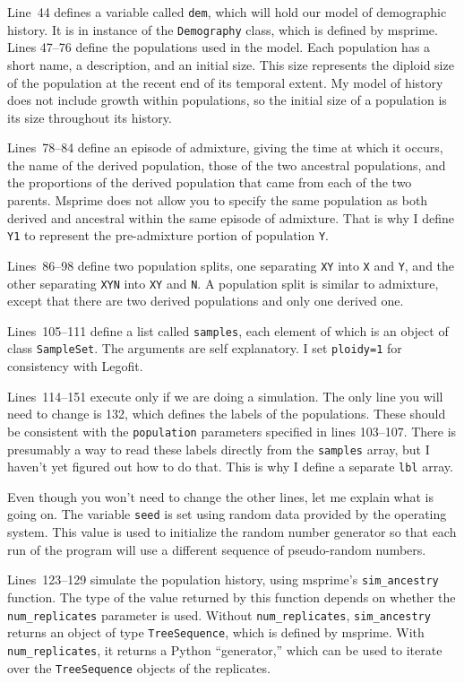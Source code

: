 \documentclass[11pt]{article}
\begin{document}
Line~44 defines a variable called \texttt{dem}, which will hold our
model of demographic history. It is in instance of the
\texttt{Demography} class, which is defined by msprime. Lines 47--76
define the populations used in the model. Each population has a short
name, a description, and an initial size. This size represents the
diploid size of the population at the recent end of its temporal
extent. My model of history does not include growth within
populations, so the initial size of a population is its size
throughout its history.

Lines~78--84 define an episode of admixture, giving the time at which
it occurs, the name of the derived population, those of the two
ancestral populations, and the proportions of the derived population
that came from each of the two parents. Msprime does not allow you to
specify the same population as both derived and ancestral within the
same episode of admixture. That is why I define \texttt{Y1} to
represent the pre-admixture portion of population \texttt{Y}.

Lines~86--98 define two population splits, one separating \texttt{XY}
into \texttt{X} and \texttt{Y}, and the other separating \texttt{XYN}
into \texttt{XY} and \texttt{N}. A population split is similar to
admixture, except that there are two derived populations and only one
derived one.

Lines~105--111 define a list called \texttt{samples}, each element of
which is an object of class \texttt{SampleSet}. The arguments are self
explanatory. I set \texttt{ploidy=1} for consistency with Legofit.

Lines~114--151 execute only if we are doing a simulation. The only
line you will need to change is 132, which defines the labels of the
populations. These should be consistent with the \texttt{population}
parameters specified in lines 103--107. There is presumably a way to
read these labels directly from the \texttt{samples} array, but I
haven't yet figured out how to do that. This is why I define a
separate \texttt{lbl} array.

Even though you won't need to change the other lines, let me explain
what is going on. The variable \texttt{seed} is set using random data
provided by the operating system. This value is used to initialize the
random number generator so that each run of the program will use a
different sequence of pseudo-random numbers.

Lines~123--129 simulate the population history, using msprime's
\verb|sim_ancestry| function. The type of the value returned by this
function depends on whether the \verb|num_replicates| parameter is
used. Without \verb|num_replicates|, \verb|sim_ancestry| returns an
object of type \texttt{TreeSequence}, which is defined by
msprime. With \verb|num_replicates|, it returns a Python
``generator,'' which can be used to iterate over the
\texttt{TreeSequence} objects of the replicates.
\end{document}
